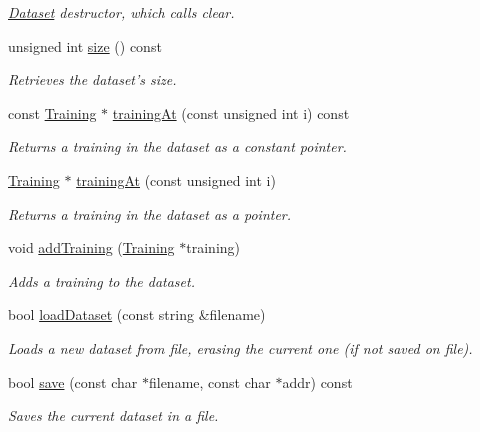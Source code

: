 \begin{DoxyCompactItemize}
\begin{DoxyCompactList}\small\item\em \hyperlink{class_dataset}{\-Dataset} destructor, which calls clear. \end{DoxyCompactList}\item 
unsigned int \hyperlink{class_dataset_a389855d6b88c8257041bcbc489759aae}{size} () const 
\begin{DoxyCompactList}\small\item\em \-Retrieves the dataset's size. \end{DoxyCompactList}\item 
const \hyperlink{class_training}{\-Training} $\ast$ \hyperlink{class_dataset_af776f6046312827aed048d641e29449b}{training\-At} (const unsigned int i) const 
\begin{DoxyCompactList}\small\item\em \-Returns a training in the dataset as a constant pointer. \end{DoxyCompactList}\item 
\hyperlink{class_training}{\-Training} $\ast$ \hyperlink{class_dataset_adf05adb75cc0692104dc809ab030e967}{training\-At} (const unsigned int i)
\begin{DoxyCompactList}\small\item\em \-Returns a training in the dataset as a pointer. \end{DoxyCompactList}\item 
void \hyperlink{class_dataset_a3dd1b2db5490c75c59b23680bb7b8b53}{add\-Training} (\hyperlink{class_training}{\-Training} $\ast$training)
\begin{DoxyCompactList}\small\item\em \-Adds a training to the dataset. \end{DoxyCompactList}\item 
bool \hyperlink{class_dataset_a371d55ca351e5f805d8d5c7ffe51c829}{load\-Dataset} (const string \&filename)
\begin{DoxyCompactList}\small\item\em \-Loads a new dataset from file, erasing the current one (if not saved on file). \end{DoxyCompactList}\item 
bool \hyperlink{class_dataset_a97193aebac43df3a98852a8a675702ab}{save} (const char $\ast$filename, const char $\ast$addr) const 
\begin{DoxyCompactList}\small\item\em \-Saves the current dataset in a file. \end{DoxyCompactList}\item 

\end{DoxyCompactItemize}

